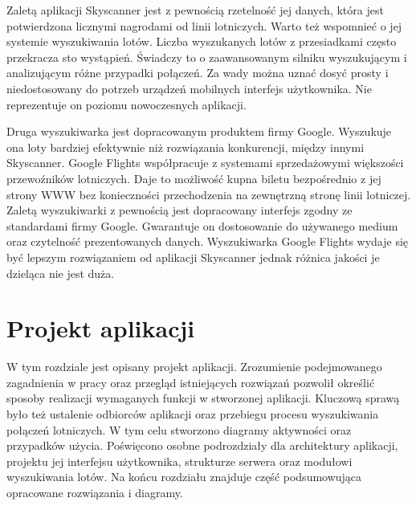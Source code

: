 \documentclass[12pt, twoside]{report}
\begin{document}
Zaletą aplikacji Skyscanner jest z pewnością rzetelność jej danych, która jest potwierdzona licznymi nagrodami od linii lotniczych. Warto też wspomnieć o jej systemie wyszukiwania lotów. Liczba wyszukanych lotów z przesiadkami często przekracza sto wystąpień. Świadczy to o zaawansowanym silniku wyszukującym i analizującym różne przypadki połączeń. Za wady można uznać dosyć prosty i niedostosowany do potrzeb urządzeń mobilnych interfejs użytkownika. Nie reprezentuje on poziomu nowoczesnych aplikacji. 

Druga wyszukiwarka jest dopracowanym produktem firmy Google. Wyszukuje ona loty bardziej efektywnie niż rozwiązania konkurencji, między innymi Skyscanner. Google Flights współpracuje z systemami sprzedażowymi większości przewoźników lotniczych. Daje to możliwość kupna biletu bezpośrednio z jej strony WWW bez konieczności przechodzenia na zewnętrzną stronę linii lotniczej. Zaletą wyszukiwarki z pewnością jest dopracowany interfejs zgodny ze standardami firmy Google. Gwarantuje on dostosowanie do używanego medium oraz czytelność prezentowanych danych. Wyszukiwarka Google Flights wydaje się być lepszym rozwiązaniem od aplikacji Skyscanner jednak różnica jakości je dzieląca nie jest duża.

\chapter{Projekt aplikacji}
W tym rozdziale jest opisany projekt aplikacji. Zrozumienie podejmowanego zagadnienia w pracy oraz przegląd istniejących rozwiązań pozwolił określić sposoby realizacji wymaganych funkcji w stworzonej aplikacji.  Kluczową sprawą było też ustalenie odbiorców aplikacji oraz przebiegu procesu wyszukiwania połączeń lotniczych. W tym celu stworzono diagramy aktywności oraz przypadków użycia. Poświęcono osobne podrozdziały dla architektury aplikacji, projektu jej interfejsu użytkownika, strukturze serwera oraz modułowi wyszukiwania lotów. Na końcu rozdziału znajduje część podsumowująca opracowane rozwiązania i diagramy.
\end{document}
